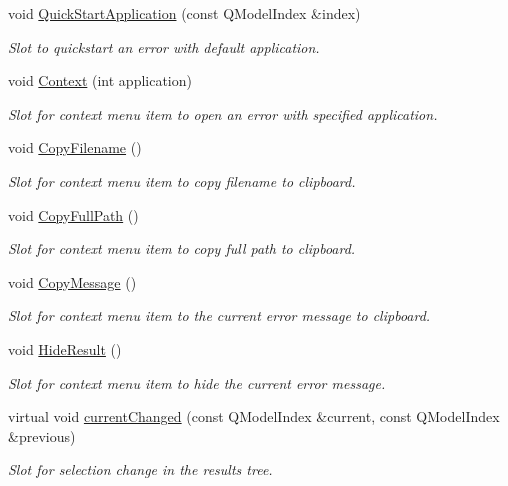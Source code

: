\begin{DoxyCompactItemize}
\item 
void \hyperlink{class_results_tree_a90d9684ab2a2cdd85f8bf87726ab8405}{Quick\-Start\-Application} (const Q\-Model\-Index \&index)
\begin{DoxyCompactList}\small\item\em Slot to quickstart an error with default application. \end{DoxyCompactList}\item 
void \hyperlink{class_results_tree_aa44bb046505efa7207162c22f94002f3}{Context} (int application)
\begin{DoxyCompactList}\small\item\em Slot for context menu item to open an error with specified application. \end{DoxyCompactList}\item 
void \hyperlink{class_results_tree_a8043ea2093ed49c5f46ec2ce97b9183d}{Copy\-Filename} ()
\begin{DoxyCompactList}\small\item\em Slot for context menu item to copy filename to clipboard. \end{DoxyCompactList}\item 
void \hyperlink{class_results_tree_a81d34f0bfc5d8eb0c4e785fda1933c2a}{Copy\-Full\-Path} ()
\begin{DoxyCompactList}\small\item\em Slot for context menu item to copy full path to clipboard. \end{DoxyCompactList}\item 
void \hyperlink{class_results_tree_ad4b71c8e9cb07b06579370a1f3af9a13}{Copy\-Message} ()
\begin{DoxyCompactList}\small\item\em Slot for context menu item to the current error message to clipboard. \end{DoxyCompactList}\item 
void \hyperlink{class_results_tree_a8abdbfd6501d249c9da5bc0e875d5883}{Hide\-Result} ()
\begin{DoxyCompactList}\small\item\em Slot for context menu item to hide the current error message. \end{DoxyCompactList}\item 
virtual void \hyperlink{class_results_tree_a4933487b685602aa451086791e147457}{current\-Changed} (const Q\-Model\-Index \&current, const Q\-Model\-Index \&previous)
\begin{DoxyCompactList}\small\item\em Slot for selection change in the results tree. \end{DoxyCompactList}\end{DoxyCompactItemize}
